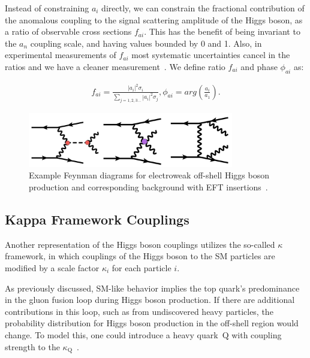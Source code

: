 Instead of constraining $a_i$ directly, we can constrain the fractional contribution of the anomalous coupling to the signal scattering amplitude of the Higgs boson, as a ratio of observable cross sections $f_{ai}$. This has the benefit of being invariant to the $a_n$ coupling scale, and having values bounded by 0 and 1. Also, in experimental measurements of $f_{ai}$ most systematic uncertainties cancel in the ratios and we have a cleaner measurement~\cite{2020}. We define ratio $f_{ai}$ and phase $\phi_{ai}$ as:

\begin{equation}
\label{eq:faiandphase}
\begin{gathered}
f_{ai} = \frac{|a_i|^2 \sigma_i}{\sum_{j=1,2,3...}|a_i|^2 \sigma_j},   \phi_{ai} = arg(\frac{a_i}{a_1}).
\end{gathered}
\end{equation}

\begin{figure}[!h]
\centering
\includegraphics[width=0.8\textwidth,clip] {figures/EFTdiagrams2.jpg}
\caption{Example Feynman diagrams for electroweak off-shell Higgs boson production and corresponding background with EFT insertions~\cite{offshellWGnote}.}
\label{fig:EFTdiagrams2}
\end{figure}

\subsection{Kappa Framework Couplings}

Another representation of the Higgs boson couplings utilizes the so-called $\kappa$ framework, in which couplings of 
the Higgs boson to the SM particles are modified by a scale factor $\kappa_i$ for each particle $i$.

As previously discussed, SM-like behavior implies the top quark's predominance in the gluon fusion loop during Higgs boson production. If there are additional contributions in this loop, such as from undiscovered heavy particles, the probability distribution for Higgs boson production in the off-shell region would change. To model this, one could introduce a heavy quark~$\mathrm{Q}$ with coupling strength to the \Hboson $\kappa_\mathrm{Q}$~\cite{Gritsan:2020pib,Davis:2021tiv}.

